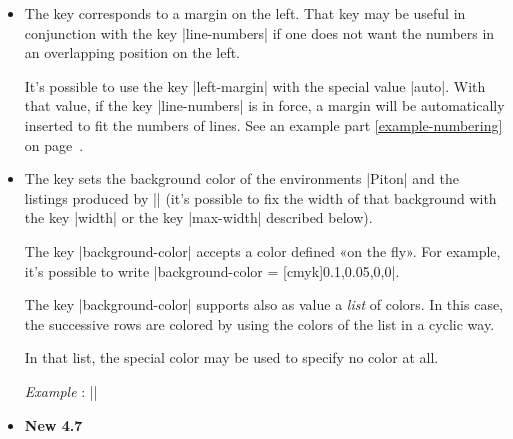 \documentclass{article}
\begin{document}
\begin{itemize}
\begin{itemize}
The initial value is |\footnotesize\color{gray}|. 
\end{itemize}

For convenience, a mechanism of factorisation of the prefix |line-numbers| is
provided. That means that it is possible, for instance, to write:
\begin{Verbatim}
\PitonOptions
  {
    line-numbers = 
      { 
        skip-empty-lines = false ,
        label-empty-lines = false ,
        sep = 1 em ,
        format = \footnotesize \color{blue}
      }
  }
\end{Verbatim}

Be careful : the previous code is not enough to print the numbers of lines.
For that, one also has to use the key |line-numbers| is a absolute way, that
is to say without value.

\item {} The key  corresponds to a
margin on the left. That key may be useful in conjunction with the key
|line-numbers| if one does not want the numbers in an overlapping position on
the left. 

It's possible to use the key |left-margin| with the special value |auto|. With that
value, if the key |line-numbers| is in force, a margin will be automatically
inserted to fit the numbers of lines. See an example part
\ref{example-numbering} on page~\pageref{example-numbering}.

\item {} \label{background-color} The key
 sets the background color of the environments
|{Piton}| and the listings produced by |\PitonInputFile| (it's possible to fix
the width of that background with the key |width| or the key |max-width|
described below).

The key |background-color| accepts a color
defined «on the fly». For example, it's possible to write
|background-color = [cmyk]{0.1,0.05,0,0}|.

\smallskip
The key |background-color| supports also as value a \emph{list} of colors. In
this case, the successive rows are colored by using the colors of the list in
a cyclic way.

\smallskip
In that list, the special color  may be used to specify no
color at all.

\emph{Example} : ||

\item {} \colorbox{yellow!50}{\textbf{New 4.7}}


\end{itemize}
\end{document}
